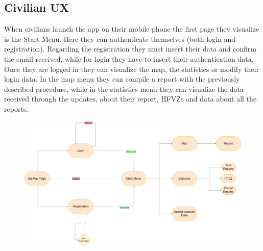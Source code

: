 \documentclass[12pt,a4paper]{article}
\begin{document}
\subsection{Civilian UX}
When civilians launch the app on their mobile phone the first page they visualize is the Start Menu. Here they can authenticate themselves (both login and registration).
Regarding the registration they must insert their data and confirm the email received, while for login they have to insert their authentication data. Once they are logged in they can visualize the map, the statistics or modify their login data. In the map menu they can compile a report with the previously described procedure, while in the statistics menu they can visualize the data received through the updates, about their report, HFVZs and data about all the reports.
\begin{figure}[H]
		\centering
			\includegraphics[width=1.0\linewidth]{Images/UX/CivilianUX}
\end{figure}
\newpage
\end{document}
